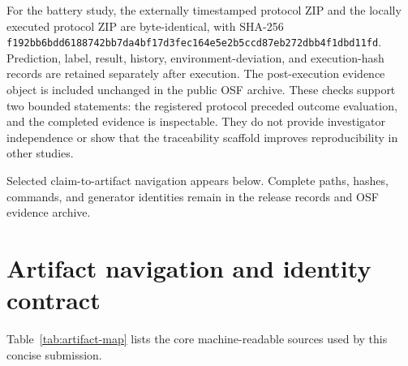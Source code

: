 \documentclass[11pt,a4paper]{article}
\begin{document}
For the battery study, the externally timestamped protocol ZIP and the locally executed protocol ZIP are byte-identical, with SHA-256 \nolinkurl{f192bb6bdd6188742bb7da4bf17d3fec164e5e2b5ccd87eb272dbb4f1dbd11fd}. Prediction, label, result, history, environment-deviation, and execution-hash records are retained separately after execution. The post-execution evidence object is included unchanged in the public OSF archive. These checks support two bounded statements: the registered protocol preceded outcome evaluation, and the completed evidence is inspectable. They do not provide investigator independence or show that the traceability scaffold improves reproducibility in other studies.

Selected claim-to-artifact navigation appears below. Complete paths, hashes, commands, and generator identities remain in the release records and OSF evidence archive.

\section{Artifact navigation and identity contract}

Table~\ref{tab:artifact-map} lists the core machine-readable sources used by this concise submission.
\end{document}
